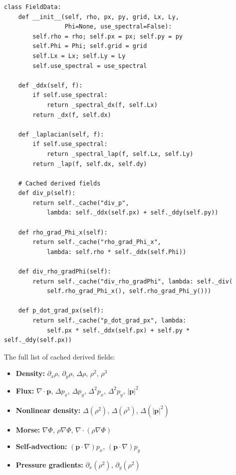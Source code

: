 \documentclass[11pt]{article}
\newcommand{\bp}{\mathbf{p}}
\begin{document}
\begin{lstlisting}[caption={fields.py --- FieldData with caching dispatch}]
class FieldData:
    def __init__(self, rho, px, py, grid, Lx, Ly,
                 Phi=None, use_spectral=False):
        self.rho = rho; self.px = px; self.py = py
        self.Phi = Phi; self.grid = grid
        self.Lx = Lx; self.Ly = Ly
        self.use_spectral = use_spectral

    def _ddx(self, f):
        if self.use_spectral:
            return _spectral_dx(f, self.Lx)
        return _dx(f, self.dx)

    def _laplacian(self, f):
        if self.use_spectral:
            return _spectral_lap(f, self.Lx, self.Ly)
        return _lap(f, self.dx, self.dy)

    # Cached derived fields
    def div_p(self):
        return self._cache("div_p",
            lambda: self._ddx(self.px) + self._ddy(self.py))

    def rho_grad_Phi_x(self):
        return self._cache("rho_grad_Phi_x",
            lambda: self.rho * self._ddx(self.Phi))

    def div_rho_gradPhi(self):
        return self._cache("div_rho_gradPhi", lambda: self._div(
            self.rho_grad_Phi_x(), self.rho_grad_Phi_y()))

    def p_dot_grad_px(self):
        return self._cache("p_dot_grad_px", lambda:
            self.px * self._ddx(self.px) + self.py * self._ddy(self.px))
\end{lstlisting}

The full list of cached derived fields:
\begin{itemize}[leftmargin=*,itemsep=1pt]
  \item \textbf{Density:} $\partial_x\rho$, $\partial_y\rho$, $\Delta\rho$, $\rho^2$, $\rho^3$
  \item \textbf{Flux:} $\nabla\cdot\bp$, $\Delta p_x$, $\Delta p_y$, $\Delta^2 p_x$, $\Delta^2 p_y$, $|\bp|^2$
  \item \textbf{Nonlinear density:} $\Delta(\rho^2)$, $\Delta(\rho^3)$, $\Delta(|\bp|^2)$
  \item \textbf{Morse:} $\nabla\Phi$, $\rho\nabla\Phi$, $\nabla\cdot(\rho\nabla\Phi)$
  \item \textbf{Self-advection:} $(\bp\cdot\nabla)p_x$, $(\bp\cdot\nabla)p_y$
  \item \textbf{Pressure gradients:} $\partial_x(\rho^2)$, $\partial_y(\rho^2)$
\end{itemize}
\end{document}
